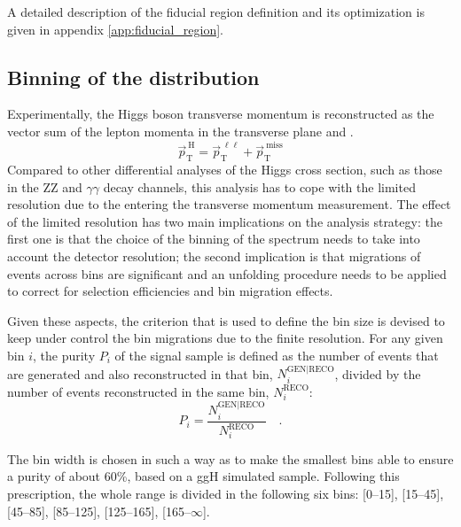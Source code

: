 A detailed description of the fiducial region definition and its optimization is given in appendix \ref{app:fiducial_region}.










\subsection{Binning of the \pth distribution}

Experimentally, the Higgs boson transverse momentum is reconstructed as the vector sum of the lepton momenta in the transverse plane and \MET.
\begin{equation}
\vec{p}_\mathrm{T}^\mathrm{~H} = \vec{p}_\mathrm{T}^{~\ell\ell} + \vec{p}_\mathrm{T}^\mathrm{~miss}
\end{equation}
Compared to other differential analyses of the Higgs cross section, such as those in the ZZ and $\gamma\gamma$ decay channels, this analysis has to cope with the limited resolution due to the \MET entering the transverse momentum measurement.
The effect of the limited \MET resolution has two main implications on the analysis strategy: the first one is that the choice of the binning of the \pth{} spectrum needs to take into account the detector resolution; the second implication is that migrations of events across bins are significant and an unfolding procedure needs to be applied to correct for selection efficiencies and bin migration effects.

Given these aspects, the criterion that is used to define the \pth bin size is devised to keep under control the bin migrations due to the finite resolution.
For any given bin $i$, the purity $P_i$ of the signal sample is defined as the number of events that are generated and also reconstructed in that bin, $N_i^\mathrm{GEN|RECO}$, divided by the number of events reconstructed in the same bin, $N_i^\mathrm{RECO}$:
\begin{equation}\label{eq:purity}
P_i = \frac{N_i^\mathrm{GEN|RECO}}{N_i^\mathrm{RECO}} \quad .
\end{equation}

The bin width is chosen in such a way as to make the smallest bins able to ensure a purity of about 60\%, based on a ggH simulated sample.
Following this prescription, the whole \pth range is divided in the following six bins: \mbox{[0--15]\GeV}, \mbox{[15--45]\GeV}, \mbox{[45--85]\GeV}, \mbox{[85--125]\GeV}, \mbox{[125--165]\GeV}, \mbox{[165--$\infty$]\GeV}.


